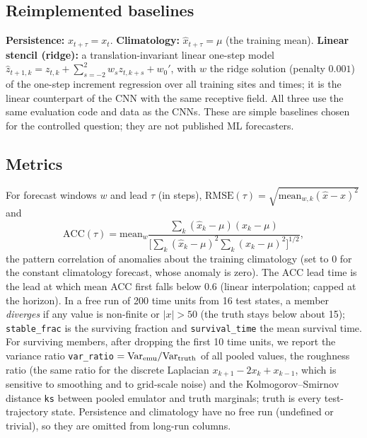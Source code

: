 \subsection{Reimplemented baselines}
\textbf{Persistence:} $\hat x_{t+\tau}=x_t$. \textbf{Climatology:} $\hat x_{t+\tau}=\mu$ (the training mean). \textbf{Linear stencil (ridge):} a translation-invariant linear one-step model $\hat z_{t+1,k}=z_{t,k}+\sum_{s=-2}^{2}w_s z_{t,k+s}+w_0'$, with $w$ the ridge solution (penalty $0.001$) of the one-step increment regression over all training sites and times; it is the linear counterpart of the CNN with the same receptive field. All three use the same evaluation code and data as the CNNs. These are simple baselines chosen for the controlled question; they are not published ML forecasters.

\subsection{Metrics}
For forecast windows $w$ and lead $\tau$ (in steps), $\mathrm{RMSE}(\tau)=\sqrt{\mathrm{mean}_{w,k}(\hat x-x)^2}$ and
\begin{equation}
\mathrm{ACC}(\tau)=\mathrm{mean}_w\frac{\sum_k (\hat x_{k}-\mu)(x_{k}-\mu)}{\big[\sum_k(\hat x_{k}-\mu)^2\sum_k(x_{k}-\mu)^2\big]^{1/2}},
\end{equation}
the pattern correlation of anomalies about the training climatology (set to $0$ for the constant climatology forecast, whose anomaly is zero). The ACC lead time is the lead at which mean ACC first falls below $0.6$ (linear interpolation; capped at the horizon). In a free run of 200 time units from 16 test states, a member \emph{diverges} if any value is non-finite or $|x|>50$ (the truth stays below about 15); \texttt{stable\_frac} is the surviving fraction and \texttt{survival\_time} the mean survival time. For surviving members, after dropping the first 10 time units, we report the variance ratio \texttt{var\_ratio} $=\mathrm{Var}_{\rm emu}/\mathrm{Var}_{\rm truth}$ of all pooled values, the roughness ratio (the same ratio for the discrete Laplacian $x_{k+1}-2x_k+x_{k-1}$, which is sensitive to smoothing and to grid-scale noise) and the Kolmogorov--Smirnov distance \texttt{ks} between pooled emulator and truth marginals; truth is every test-trajectory state. Persistence and climatology have no free run (undefined or trivial), so they are omitted from long-run columns.
